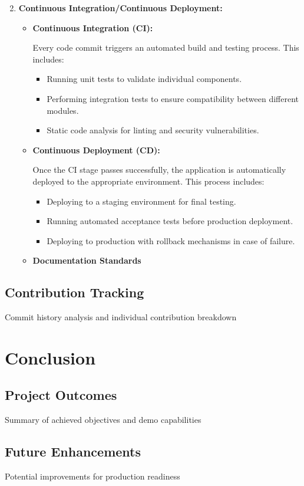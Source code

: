 \documentclass{llncs}
\begin{document}
\begin{enumerate}
    \setcounter{enumi}{1}
    \item \textbf{Continuous Integration/Continuous Deployment:}
          \begin{itemize}
              \item \textbf{Continuous Integration (CI):}

                    Every code commit triggers an automated build and testing process. This includes:
                    \begin{itemize}
                        \item Running unit tests to validate individual components.
                        \item Performing integration tests to ensure compatibility between different modules.
                        \item Static code analysis for linting and security vulnerabilities.
                    \end{itemize}

                    \bigskip %
              \item \textbf{Continuous Deployment (CD):}

                    Once the CI stage passes successfully, the application is automatically deployed to the appropriate environment. This process includes:
                    \begin{itemize}
                        \item Deploying to a staging environment for final testing.
                        \item Running automated acceptance tests before production deployment.
                        \item Deploying to production with rollback mechanisms in case of failure.
                    \end{itemize}

                    \bigskip %

              \item \textbf{Documentation Standards}
          \end{itemize}
\end{enumerate}


\subsection{Contribution Tracking}
Commit history analysis and individual contribution breakdown

\section{Conclusion}
\subsection{Project Outcomes}
Summary of achieved objectives and demo capabilities

\subsection{Future Enhancements}
Potential improvements for production readiness

\begin{thebibliography}{9}

\end{thebibliography}
\end{document}
